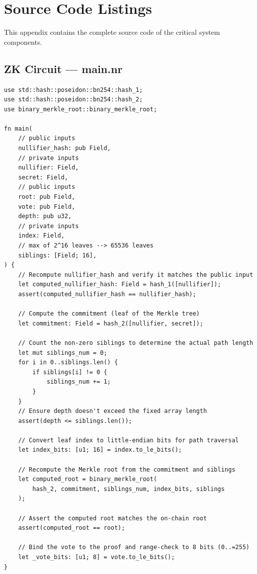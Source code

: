 \chapter{Source Code Listings}\label{app:source}

This appendix contains the complete source code of the critical system components.

\section{ZK Circuit --- main.nr}

\begin{lstlisting}[caption={Complete Noir ZK circuit (packages/circuits/src/main.nr)}]
use std::hash::poseidon::bn254::hash_1;
use std::hash::poseidon::bn254::hash_2;
use binary_merkle_root::binary_merkle_root;

fn main(
    // public inputs
    nullifier_hash: pub Field,
    // private inputs
    nullifier: Field,
    secret: Field,
    // public inputs
    root: pub Field,
    vote: pub Field,
    depth: pub u32,
    // private inputs
    index: Field,
    // max of 2^16 leaves --> 65536 leaves
    siblings: [Field; 16],
) {
    // Recompute nullifier_hash and verify it matches the public input
    let computed_nullifier_hash: Field = hash_1([nullifier]);
    assert(computed_nullifier_hash == nullifier_hash);

    // Compute the commitment (leaf of the Merkle tree)
    let commitment: Field = hash_2([nullifier, secret]);

    // Count the non-zero siblings to determine the actual path length
    let mut siblings_num = 0;
    for i in 0..siblings.len() {
        if siblings[i] != 0 {
            siblings_num += 1;
        }
    }
    // Ensure depth doesn't exceed the fixed array length
    assert(depth <= siblings.len());

    // Convert leaf index to little-endian bits for path traversal
    let index_bits: [u1; 16] = index.to_le_bits();

    // Recompute the Merkle root from the commitment and siblings
    let computed_root = binary_merkle_root(
        hash_2, commitment, siblings_num, index_bits, siblings
    );

    // Assert the computed root matches the on-chain root
    assert(computed_root == root);

    // Bind the vote to the proof and range-check to 8 bits (0..=255)
    let _vote_bits: [u1; 8] = vote.to_le_bits();
}
\end{lstlisting}

